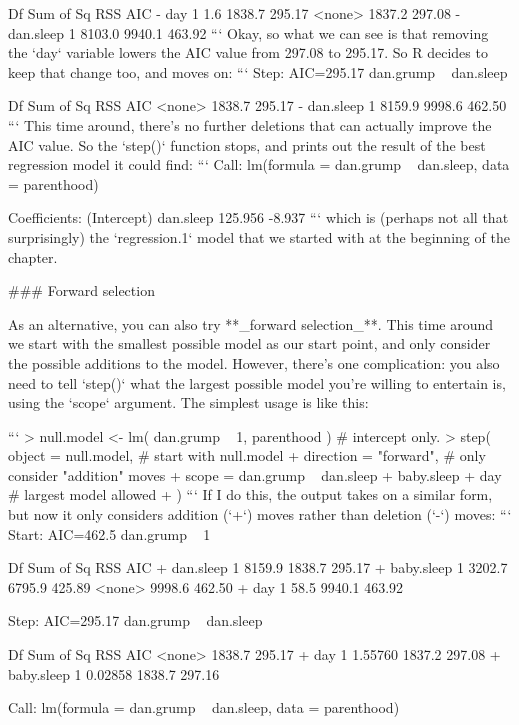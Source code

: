             Df Sum of Sq    RSS    AIC
- day        1       1.6 1838.7 295.17
<none>                   1837.2 297.08
- dan.sleep  1    8103.0 9940.1 463.92
```
Okay, so what we can see is that removing the `day` variable lowers the AIC value from 297.08 to 295.17. So R decides to keep that change too, and moves on:
```
Step:  AIC=295.17
dan.grump ~ dan.sleep

            Df Sum of Sq    RSS    AIC
<none>                   1838.7 295.17
- dan.sleep  1    8159.9 9998.6 462.50
```
This time around, there's no further deletions that can actually improve the AIC value. So the `step()` function stops, and prints out the result of the best regression model it could find:
```
Call:
lm(formula = dan.grump ~ dan.sleep, data = parenthood)

Coefficients:
(Intercept)    dan.sleep  
    125.956       -8.937  
```
which is (perhaps not all that surprisingly) the `regression.1` model that we started with at the beginning of the chapter.

### Forward selection

As an alternative, you can also try **_forward selection_**. This time around we start with the smallest possible model as our start point, and only consider the possible additions to the model. However, there's one complication: you also need to tell `step()` what the largest possible model you're willing to entertain is, using the `scope` argument. The simplest usage is like this:

```
> null.model <- lm( dan.grump ~ 1, parenthood )   # intercept only.
> step( object = null.model,     # start with null.model
+       direction = "forward",   # only consider "addition" moves
+       scope =  dan.grump ~ dan.sleep + baby.sleep + day  # largest model allowed
+ )
```
If I do this, the output takes on a similar form, but now it only considers addition (`+`) moves rather than deletion (`-`) moves: 
```
Start:  AIC=462.5
dan.grump ~ 1

             Df Sum of Sq    RSS    AIC
+ dan.sleep   1    8159.9 1838.7 295.17
+ baby.sleep  1    3202.7 6795.9 425.89
<none>                    9998.6 462.50
+ day         1      58.5 9940.1 463.92

Step:  AIC=295.17
dan.grump ~ dan.sleep

             Df Sum of Sq    RSS    AIC
<none>                    1838.7 295.17
+ day         1   1.55760 1837.2 297.08
+ baby.sleep  1   0.02858 1838.7 297.16

Call:
lm(formula = dan.grump ~ dan.sleep, data = parenthood)

